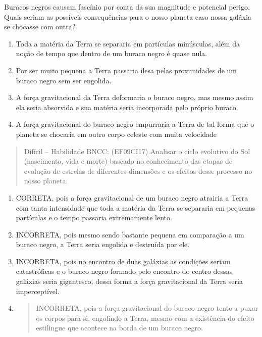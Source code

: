 Buracos negros causam fascínio por conta da sua magnitude e potencial
perigo. Quais seriam as possíveis consequências para o nosso planeta
caso nossa galáxia se chocasse com outra?

\begin{enumerate}
\def\labelenumi{(\Alph{enumi})}
\item
  Toda a matéria da Terra se separaria em partículas minúsculas, além da
  noção de tempo que dentro de um buraco negro é quase nula.
\item
  Por ser muito pequena a Terra passaria ilesa pelas proximidades de um
  buraco negro sem ser engolida.
\item
  A força gravitacional da Terra deformaria o buraco negro, mas mesmo
  assim ela seria absorvida e sua matéria seria incorporada pelo próprio
  buraco.
\item
  A força gravitacional do buraco negro empurraria a Terra de tal forma
  que o planeta se chocaria em outro corpo celeste com muita velocidade
\end{enumerate}

\begin{quote}
Difícil -- Habilidade BNCC: (EF09CI17) Analisar o ciclo evolutivo do Sol
(nascimento, vida e morte) baseado no conhecimento das etapas de
evolução de estrelas de diferentes dimensões e os efeitos desse processo
no nosso planeta.
\end{quote}

\begin{enumerate}
\def\labelenumi{(\Alph{enumi})}
\item
  CORRETA, pois a força gravitacional de um buraco negro atrairia a
  Terra com tanta intensidade que toda a matéria da Terra se separaria
  em pequenas partículas e o tempo passaria extremamente lento.
\item
  INCORRETA, pois mesmo sendo bastante pequena em comparação a um buraco
  negro, a Terra seria engolida e destruída por ele.
\item
  INCORRETA, pois no encontro de duas galáxias as condições seriam
  catastróficas e o buraco negro formado pelo encontro do centro dessas
  galáxias seria gigantesco, dessa forma a força gravitacional da Terra
  seria imperceptível.
\item
  \begin{quote}
  INCORRETA, pois a força gravitacional do buraco negro tente a puxar os
  corpos para si, engolindo a Terra, mesmo com a existência do efeito
  estilingue que acontece na borda de um buraco negro.
  \end{quote}
\end{enumerate}

